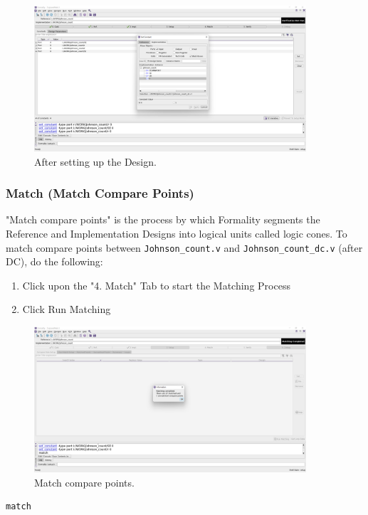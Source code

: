 \documentclass[a4paper,12pt,twoside]{article}
\begin{document}
\begin{figure}[H]
    \centering
    \includegraphics[width=0.9\textwidth]{images/47.png}
    \caption{After setting up the Design.}
\end{figure}
\subsubsection{Match (Match Compare Points)}\label{SMatch}
"Match compare points" is the process by which Formality segments the Reference and Implementation Designs into logical units called logic cones. To match compare points between \texttt{Johnson\_count.v} and \texttt{Johnson\_count\_dc.v} (after DC), do the following:
\begin{enumerate}
    \item Click upon the "4. Match" Tab to start the Matching Process
    \item Click Run Matching
\end{enumerate}
\begin{figure}[H]
    \centering
    \includegraphics[width=0.9\textwidth]{images/48.png}
    \caption{Match compare points.}
\end{figure}
\begin{verbatim}
match
\end{verbatim}
\end{document}
